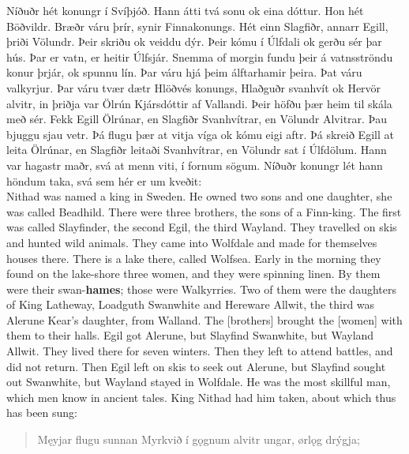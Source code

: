 
Níðuðr hét konungr í Svíþjóð. Hann átti tvá sonu ok eina dóttur. Hon hét Böðvildr. Bræðr váru þrír, synir Finnakonungs. Hét einn Slagfiðr, annarr Egill, þriði Völundr. Þeir skriðu ok veiddu dýr. Þeir kómu í Úlfdali ok gerðu sér þar hús. Þar er vatn, er heitir Úlfsjár. Snemma of morgin fundu þeir á vatnsströndu konur þrjár, ok spunnu lín. Þar váru hjá þeim álftarhamir þeira. Þat váru valkyrjur. Þar váru tvær dætr Hlöðvés konungs, Hlaðguðr svanhvít ok Hervör alvitr, in þriðja var Ölrún Kjársdóttir af Vallandi. Þeir höfðu þær heim til skála með sér. Fekk Egill Ölrúnar, en Slagfiðr Svanhvítrar, en Völundr Alvitrar. Þau bjuggu sjau vetr. Þá flugu þær at vitja víga ok kómu eigi aftr. Þá skreið Egill at leita Ölrúnar, en Slagfiðr leitaði Svanhvítrar, en Völundr sat í Úlfdölum. Hann var hagastr maðr, svá at menn viti, í fornum sögum. Níðuðr konungr lét hann höndum taka, svá sem hér er um kveðit: \\%

Nithad was named a king in Sweden. He owned two sons and one daughter, she was called Beadhild. There were three brothers, the sons of a Finn-king. The first was called Slayfinder, the second Egil, the third Wayland. They travelled on skis and hunted wild animals. They came into Wolfdale and made for themselves houses there. There is a lake there, called Wolfsea. Early in the morning they found on the lake-shore three women, and they were spinning linen. By them were their swan-\textbf{hames}; those were Walkyrries. Two of them were the daughters of King Latheway, Loadguth Swanwhite and Hereware Allwit, the third was Alerune Kear's daughter, from Walland. The [brothers] brought the [women] with them to their halls. Egil got Alerune, but Slayfind Swanwhite, but Wayland Allwit. They lived there for seven winters. Then they left to attend battles, and did not return. Then Egil left on skis to seek out Alerune, but Slayfind sought out Swanwhite, but Wayland stayed in Wolfdale. He was the most skillful man, which men know in ancient tales. King Nithad had him taken, about which thus has been sung: \\

\begin{verse}
\bva Męyjar flugu sunnan \hld Myrkvið í gǫgnum
alvitr ungar, \hld ørlǫg drýgja; \\%
\end{verse}

